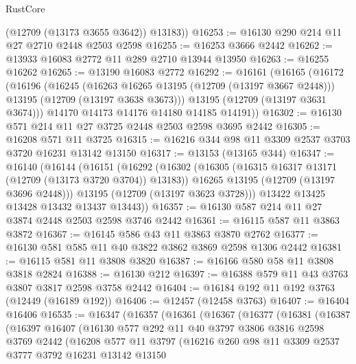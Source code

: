 \begin{lexlean}{RustCore}
\begin{coremodule}
        (@12709 (@13173 @3655 @3642))
        @13183))
@16253 := @16130 @290 @214 @11 @27 @2710 @2448 @2503 @2598
@16255 := @16253 @3666 @2442
@16262 := @13933 @16083 @2772 @11 @289 @2710 @13944 @13950
@16263 := @16255 @16262
@16265 := @13190 @16083 @2772
@16292 := @16161
    (@16165
      (@16172
        (@16196
          (@16245
            (@16263 @16265 @13195 (@12709 (@13197 @3667 @2448)))
            @13195
            (@12709 (@13197 @3638 @3673)))
          @13195
          (@12709 (@13197 @3631 @3674)))
        @14170
        @14173
        @14176
        @14180
        @14185
        @14191))
@16302 := @16130 @571 @214 @11 @27 @3725 @2448 @2503 @2598 @3695 @2442
@16305 := @16208 @571 @11 @3725
@16315 := @16216 @344 @98 @11 @3309 @2537 @3703 @3720 @16231 @13142 @13150
@16317 := @13153 (@13165 @344)
@16347 := @16140
    (@16144
      (@16151
        (@16292
          (@16302
            (@16305 (@16315 @16317 @13171 (@12709 (@13173 @3720 @3704)) @13183))
            @16265
            @13195
            (@12709 (@13197 @3696 @2448)))
          @13195
          (@12709 (@13197 @3623 @3728)))
        @13422
        @13425
        @13428
        @13432
        @13437
        @13443))
@16357 := @16130 @587 @214 @11 @27 @3874 @2448 @2503 @2598 @3746 @2442
@16361 := @16115 @587 @11 @3863 @3872
@16367 := @16145 @586 @43 @11 @3863 @3870 @2762
@16377 := @16130 @581 @585 @11 @40 @3822 @3862 @3869 @2598 @1306 @2442
@16381 := @16115 @581 @11 @3808 @3820
@16387 := @16166 @580 @58 @11 @3808 @3818 @2824
@16388 := @16130 @212
@16397 := @16388 @579 @11 @43 @3763 @3807 @3817 @2598 @3758 @2442
@16404 := @16184 @192 @11 @192 @3763 (@12449 (@16189 @192))
@16406 := @12457 (@12458 @3763)
@16407 := @16404 @16406
@16535 := @16347
    (@16357
      (@16361
        (@16367
          (@16377
            (@16381
              (@16387
                (@16397
                  @16407
                  (@16130
                    @577
                    @292
                    @11
                    @40
                    @3797
                    @3806
                    @3816
                    @2598
                    @3769
                    @2442
                    (@16208
                      @577
                      @11
                      @3797
                      (@16216
                        @260
                        @98
                        @11
                        @3309
                        @2537
                        @3777
                        @3792
                        @16231
                        @13142
                        @13150

\end{coremodule}
\end{lexlean}

